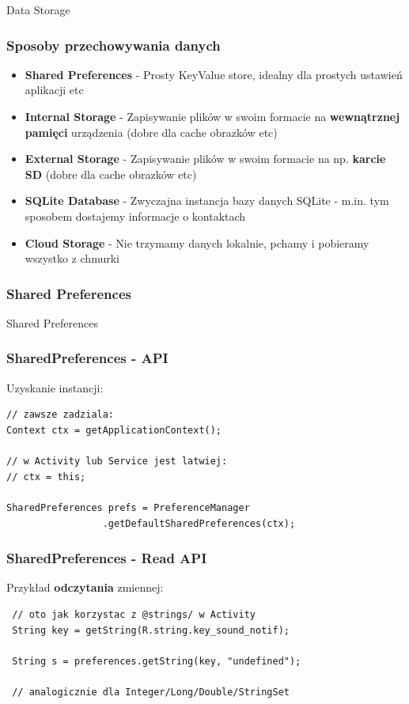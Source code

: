 \begin{frame}
 \begin{center}
  \Huge{Data Storage}
 \end{center}

\end{frame}


\begin{frame}\frametitle{Sposoby przechowywania danych}
\begin{itemize}
 \item  \textbf{Shared Preferences} - Prosty KeyValue store, idealny dla prostych ustawień aplikacji etc
 \pause \item \textbf{Internal Storage} - Zapisywanie plików w swoim formacie na \textbf{wewnątrznej pamięci} urządzenia (dobre dla cache obrazków etc)
 \pause \item \textbf{External Storage} - Zapisywanie plików w swoim formacie na np. \textbf{karcie SD} (dobre dla cache obrazków etc)
 \pause \item \textbf{SQLite Database} - Zwyczajna instancja bazy danych SQLite - m.in. tym sposobem dostajemy informacje o kontaktach
 \pause \item \textbf{Cloud Storage} - Nie trzymamy danych lokalnie, pchamy i pobieramy wszystko z chmurki
\end{itemize}
\end{frame}


\begin{frame}\frametitle{Shared Preferences}
\begin{center}
 \Huge{Shared Preferences} 
\end{center}
\end{frame}

\begin{frame}[fragile]\frametitle{SharedPreferences - API}
Uzyskanie instancji:
\begin{lstlisting}
// zawsze zadziala:
Context ctx = getApplicationContext(); 

// w Activity lub Service jest latwiej:
// ctx = this;

SharedPreferences prefs = PreferenceManager
                 .getDefaultSharedPreferences(ctx);
\end{lstlisting}
\end{frame}


\begin{frame}[fragile]\frametitle{SharedPreferences - Read API}
 Przykład \textbf{odczytania} zmiennej:
\begin{lstlisting}
 // oto jak korzystac z @strings/ w Activity
 String key = getString(R.string.key_sound_notif);

 String s = preferences.getString(key, "undefined");
 
 // analogicznie dla Integer/Long/Double/StringSet
\end{lstlisting}
\end{frame}

